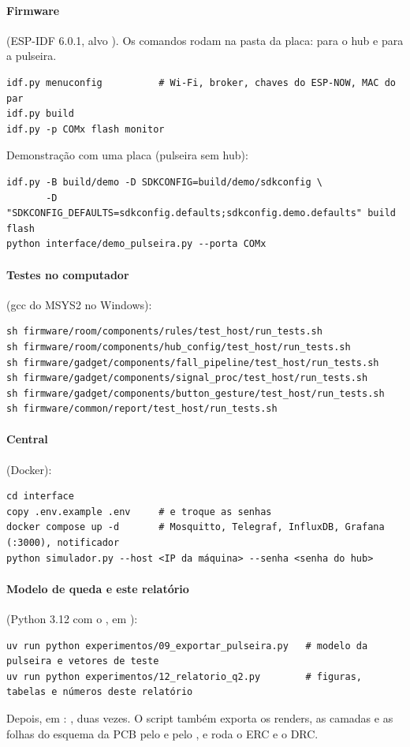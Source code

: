 \paragraph{Firmware} (ESP-IDF 6.0.1, alvo ). Os comandos rodam na pasta da
placa:  para o hub e  para a pulseira.
\begin{lstlisting}
idf.py menuconfig          # Wi-Fi, broker, chaves do ESP-NOW, MAC do par
idf.py build
idf.py -p COMx flash monitor
\end{lstlisting}
Demonstração com uma placa (pulseira sem hub):
\begin{lstlisting}
idf.py -B build/demo -D SDKCONFIG=build/demo/sdkconfig \
       -D "SDKCONFIG_DEFAULTS=sdkconfig.defaults;sdkconfig.demo.defaults" build flash
python interface/demo_pulseira.py --porta COMx
\end{lstlisting}

\paragraph{Testes no computador} (gcc do MSYS2 no Windows):
\begin{lstlisting}
sh firmware/room/components/rules/test_host/run_tests.sh
sh firmware/room/components/hub_config/test_host/run_tests.sh
sh firmware/gadget/components/fall_pipeline/test_host/run_tests.sh
sh firmware/gadget/components/signal_proc/test_host/run_tests.sh
sh firmware/gadget/components/button_gesture/test_host/run_tests.sh
sh firmware/common/report/test_host/run_tests.sh
\end{lstlisting}

\paragraph{Central} (Docker):
\begin{lstlisting}
cd interface
copy .env.example .env     # e troque as senhas
docker compose up -d       # Mosquitto, Telegraf, InfluxDB, Grafana (:3000), notificador
python simulador.py --host <IP da máquina> --senha <senha do hub>
\end{lstlisting}

\paragraph{Modelo de queda e este relatório} (Python 3.12 com o , em ):
\begin{lstlisting}
uv run python experimentos/09_exportar_pulseira.py   # modelo da pulseira e vetores de teste
uv run python experimentos/12_relatorio_q2.py        # figuras, tabelas e números deste relatório
\end{lstlisting}
Depois, em : , duas
vezes. O script também exporta os renders, as camadas e as folhas do esquema da PCB pelo
\code{kicad-cli} e pelo \code{pdftoppm}, e roda o ERC e o DRC.
